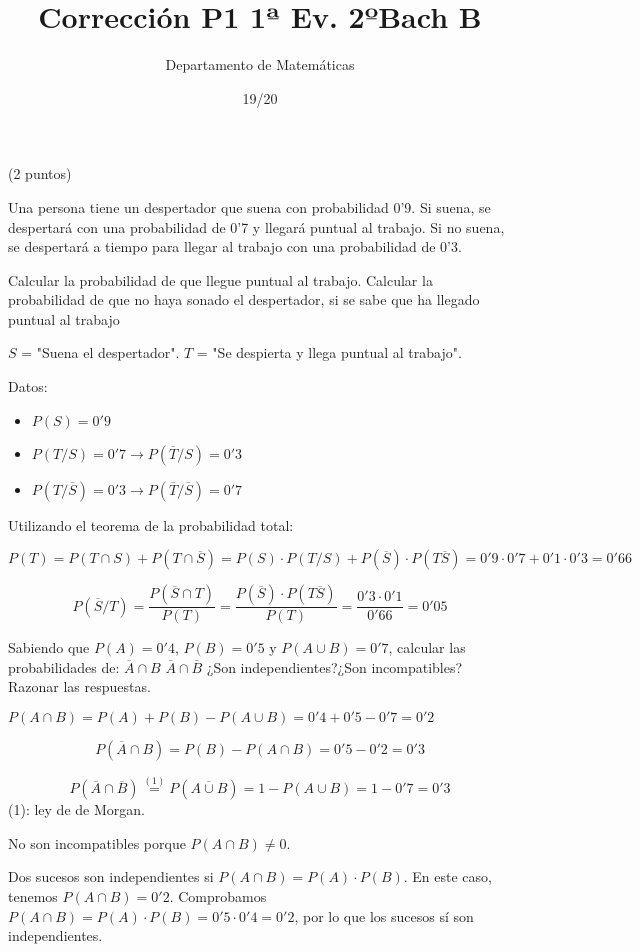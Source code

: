 \documentclass[palatino,nosec,nochap,nobuilddate]{Docencia}
\title{Corrección P1 1ª Ev. 2ºBach B}
\author{Departamento de Matemáticas}
\date{19/20}
\newcommand\BackgroundPic{%
\put(0,0){%
\parbox[b][\paperheight]{\paperwidth}{%
\vfill
\centering
\texttt{[image: ../../../../BWLogo.jpeg]}%
\vfill
}}}
\begin{document}
\pagestyle{plain}
\maketitle


\newpage
\begin{problem}(2 puntos)

Una persona tiene un despertador que suena con probabilidad 0'9. Si suena, se despertará con una probabilidad de 0'7 y llegará puntual al trabajo. Si no suena, se despertará a tiempo para llegar al trabajo con una probabilidad de 0'3.

\ppart Calcular la probabilidad de que llegue puntual al trabajo.
\ppart Calcular la probabilidad de que no haya sonado el despertador, si se sabe que ha llegado puntual al trabajo
\solution

$S$ = "Suena el despertador". \;\;\;\; $T$ = "Se despierta y llega puntual al trabajo". 

Datos:
\begin{itemize}
	\item $P(S) = 0'9$
	\item $P(T/S) = 0'7 \to P(\overline{T}/S) = 0'3$ 
	\item $P(T/\overline{S}) = 0'3 \to P(\overline{T}/\overline{S}) = 0'7$
\end{itemize}
\spart
Utilizando el teorema de la probabilidad total:

\[P(T) = P(T\cap S) + P(T\cap \overline{S}) = P(S)·P(T/S) + P(\overline{S})·P(T\overline{S}) = 0'9·0'7 + 0'1·0'3 = 0'66\]

\spart

\[P(\overline{S}/T) = \frac{P(\overline{S}\cap T)}{P(T)} = \frac{P(\overline{S})·P(T\overline{S})}{P(T)} =\frac{0'3·0'1}{0'66} = 0'05\]

\end{problem}

\begin{problem}
Sabiendo que $P(A) = 0'4$, $P(B) = 0'5$ y $P(A\cup B) = 0'7$, calcular las probabilidades de:
\ppart $\overline{A}\cap B$
\ppart $\overline{A}\cap\overline{B}$
\ppart ¿Son independientes?¿Son incompatibles? Razonar las respuestas.

\solution

$P(A\cap B) = P(A) + P(B) - P(A\cup B) = 0'4+0'5-0'7 = 0'2$

\spart \[P(\overline{A}\cap B) = P(B) - P(A\cap B) = 0'5-0'2 = 0'3\]

\spart \[P(\overline{A}\cap\overline{B}) \overset{(1)}{=} P\left(\overline{A\cup B}\right) = 1 - P(A\cup B) = 1-0'7 = 0'3 \]
(1): ley de de Morgan.

\spart 
No son incompatibles porque $P(A\cap B) \neq 0$.

Dos sucesos son independientes si $P(A\cap B) = P(A)·P(B)$. En este caso, tenemos $P(A\cap B) = 0'2$. Comprobamos $P(A\cap B) = P(A)·P(B) = 0'5·0'4 = 0'2$, por lo que los sucesos sí son independientes.

\end{problem}
\end{document}

